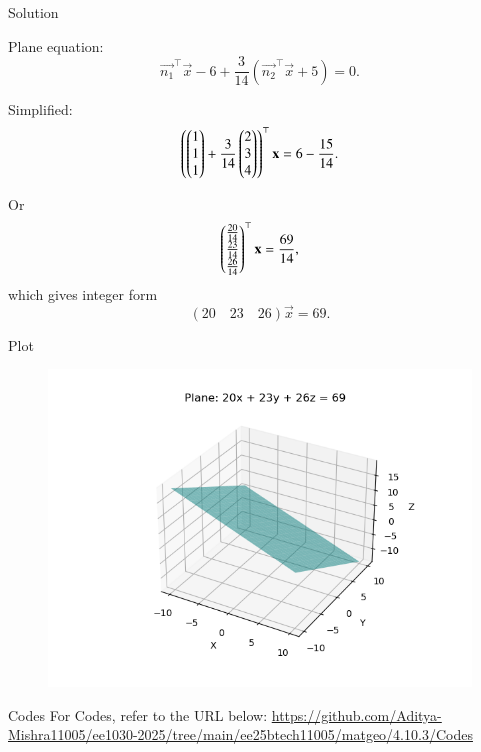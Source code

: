 \documentclass{beamer}
\begin{document}
\begin{frame}{Solution}

Plane equation:
\[
\vec{n_1}^\top \vec{x} - 6 + \frac{3}{14} \left(\vec{n_2}^\top \vec{x} + 5 \right) = 0.
\]

Simplified:
\[
\left(\begin{pmatrix}1 \\ 1 \\ 1\end{pmatrix} + \frac{3}{14} \begin{pmatrix}2 \\ 3 \\ 4\end{pmatrix} \right)^\top \mathbf{x} = 6 - \frac{15}{14}.
\]

Or
\[
\begin{pmatrix}\frac{20}{14} \\ \frac{23}{14} \\ \frac{26}{14}\end{pmatrix}^\top \mathbf{x} = \frac{69}{14},
\]
which gives integer form
\[
\boxed{
(20 \quad 23 \quad 26) \vec{x} = 69
}.
\]
\end{frame}
\begin{frame}{Plot}
\begin{figure}
    \centering
    \includegraphics[width=0.8\columnwidth]{Figs/Figure.png}
\end{figure}
\end{frame}

\begin{frame}{Codes}
\centering
For Codes, refer to the URL below:  
\url{https://github.com/Aditya-Mishra11005/ee1030-2025/tree/main/ee25btech11005/matgeo/4.10.3/Codes}
\end{frame}
\end{document}
